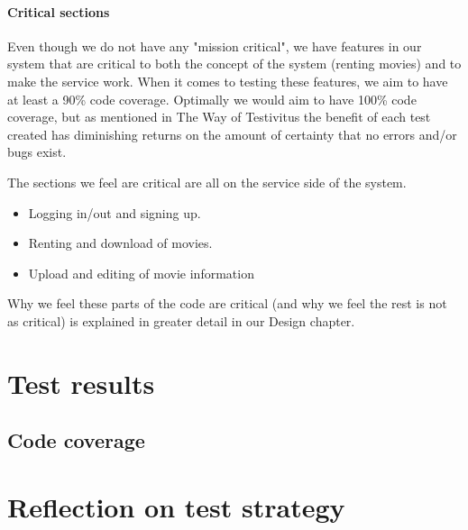 \paragraph{Critical sections}
Even though we do not have any "mission critical", we have features in our system that are critical to both the concept of the system (renting movies) and to make the service work. When it comes to testing these features, we aim to have at least a 90\% code coverage. Optimally we would aim to have 100\% code coverage, but as mentioned in The Way of Testivitus\cite{The Way of Testivus} the benefit of each test created has diminishing returns on the amount of certainty that no errors and/or bugs exist.

The sections we feel are critical are all on the service side of the system.
\begin{itemize}
\item Logging in/out and signing up.
\item Renting and download of movies.
\item Upload and editing of movie information
\end{itemize}

Why we feel these parts of the code are critical (and why we feel the rest is not as critical) is explained in greater detail in our Design chapter.

\section{Test results}
\label{testing_results}
\subsection{Code coverage}
\label{testing_results_coverage}
\section{Reflection on test strategy}
\label{testing_reflection}